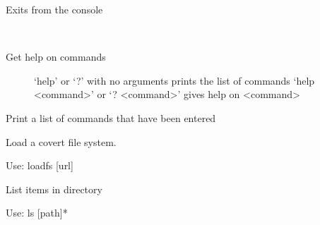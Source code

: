 \documentclass[letterpaper,12pt,openany,oneside]{sphinxmanual}
\begin{document}
\begin{fulllineitems}

\begin{fulllineitems}
\label{main:main.Console.do_exit}
Exits from the console

\end{fulllineitems}


\begin{fulllineitems}
\label{main:main.Console.do_help}~\begin{description}
\item[{Get help on commands}] \leavevmode
`help' or `?' with no arguments prints the list of commands
`help \textless{}command\textgreater{}' or `? \textless{}command\textgreater{}' gives help on \textless{}command\textgreater{}

\end{description}

\end{fulllineitems}


\begin{fulllineitems}
\label{main:main.Console.do_hist}
Print a list of commands that have been entered

\end{fulllineitems}


\begin{fulllineitems}
\label{main:main.Console.do_loadfs}
Load a covert file system.

Use: loadfs {[}url{]}

\end{fulllineitems}


\begin{fulllineitems}
\label{main:main.Console.do_ls}
List items in directory

Use: ls {[}path{]}*

\end{fulllineitems}


\end{fulllineitems}
\end{document}
